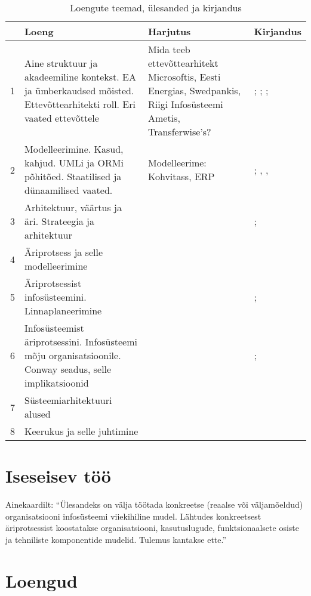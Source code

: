 \documentclass[nobib]{tufte-handout}
\begin{document}
\renewcommand{\arraystretch}{1.3}
\begin{table*}[ht]
\small
	\centering
	\selectfont
	\begin{tabular}{lp{5cm}p{6cm}p{4cm}}
		\toprule
		& Loeng & Harjutus & Kirjandus\\
		\midrule
		1 & Aine struktuur ja akadeemiline kontekst. EA ja ümberkaudsed mõisted. Ettevõttearhitekti roll. Eri vaated ettevõttele & Mida teeb ettevõttearhitekt Microsoftis, Eesti Energias, Swedpankis, Riigi Infosüsteemi Ametis, Transferwise's?  & \cite{parsons2005enterprise}; \cite{hickey}; \cite{sysengineering}; \cite{winter2006essential}\\
		2 & Modelleerimine. Kasud, kahjud. UMLi ja ORMi põhitõed. Staatilised ja dünaamilised vaated. & Modelleerime: Kohvitass, ERP & \cite{OPM}; \cite{heumann2005introduction}, \cite{box1976science}, \cite[peatükk 3]{ferenvcik2004survey}\\
		3 & Arhitektuur, väärtus ja äri. Strateegia ja arhitektuur & & \cite{gadiesh2001transforming}; \cite{senge2002leader}\\
		4 & Äriprotsess ja selle modelleerimine & & \cite{wohed2006suitability}\\
		5 & Äriprotsessist infosüsteemini. Linnaplaneerimine & & \cite{longepe2003enterprise}; \cite{bertin2014urbanization}\\
		6 & Infosüsteemist äriprotsessini. Infosüsteemi mõju organisatsioonile. Conway seadus, selle implikatsioonid & & \cite{conway1968committees}; \cite{maccormack2012exploring}\\
		7 & Süsteemiarhitektuuri alused & & \cite{crawley2015system}\\
		8 & Keerukus ja selle juhtimine & & \cite{holt2017so}\\
	\end{tabular}
	\caption{Loengute teemad, ülesanded ja kirjandus}
	\label{tab:content}
\end{table*}

\section{Iseseisev töö}
Ainekaardilt: \enquote{Ülesandeks on välja töötada konkreetse (reaalse või väljamõeldud) organisatsiooni infosüsteemi viiekihiline mudel. Lähtudes konkreetsest äriprotsessist koostatakse organisatsiooni, kasutuslugude, funktsionaalsete osiste ja tehniliste komponentide mudelid. Tulemus kantakse ette.}

\section{Loengud}
\end{document}
